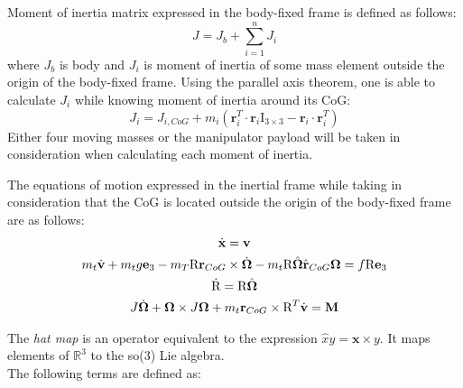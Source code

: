 Moment of inertia matrix expressed in the body-fixed frame is defined as follows:
\begin{equation}
J = J_b + \sum_{i=1}^{n}J_i
\end{equation}
where $J_b$ is body and $J_i$ is moment of inertia of some mass element outside the origin of the body-fixed frame. Using the parallel axis theorem, one is able to calculate $J_i$ while knowing moment of inertia around its CoG:
\begin{equation}
J_i = J_{i,CoG} + m_i( \textbf{r}_i^T \cdot  \textbf{r}_i \text{I}_{3 \times 3} -  \textbf{r}_i \cdot  \textbf{r}_i^T)
\end{equation}
Either four moving masses or the manipulator payload will be taken in consideration when calculating each moment of inertia.

The equations of motion expressed in the inertial frame while taking in consideration that the CoG is located outside the origin of the body-fixed frame are as follows\cite{LeeModel}: 
\begin{gather}
	\dot{\textbf{x}} = \textbf{v} \label{model1}\\
	m_t\dot{\textbf{v}} + m_tg\textbf{e}_3 - m_T\text{R}  \textbf{r}_{CoG} \times \dot{\boldsymbol{\Omega}} - m_t\text{R}\hat{\boldsymbol{\Omega}}\hat{ \textbf{r}}_{CoG}\boldsymbol{\Omega} = f\text{R}\textbf{e}_3 \label{model2} \\
	\dot{\text{R}} = \text{R}\hat{\boldsymbol{\Omega}} \label{model3} \\
	J \dot{\boldsymbol{\Omega}} + \boldsymbol{\Omega} \times J \boldsymbol{\Omega} + m_t  \textbf{r}_{CoG} \times \text{R}^T \dot{\textbf{v}} = \textbf{M} \label{model4}
\end{gather}

\noindent The \textit{hat map} is an operator equivalent to the expression $\hat{x}y = \textbf{x} \times y$. It maps elements of $\mathbb{R}^3$ to the so(3) Lie algebra. \\

\noindent The following terms are defined as:

